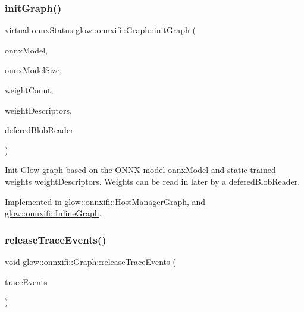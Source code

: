 \subsubsection{\texorpdfstring{init\+Graph()}{initGraph()}}
{\footnotesize\ttfamily virtual onnx\+Status glow\+::onnxifi\+::\+Graph\+::init\+Graph (\begin{DoxyParamCaption}\item[{const void $\ast$}]{onnx\+Model,  }\item[{size\+\_\+t}]{onnx\+Model\+Size,  }\item[{uint32\+\_\+t}]{weight\+Count,  }\item[{const onnx\+Tensor\+Descriptor\+V1 $\ast$}]{weight\+Descriptors,  }\item[{void $\ast$}]{defered\+Blob\+Reader }\end{DoxyParamCaption})\hspace{0.3cm}{\ttfamily [pure virtual]}}

Init Glow graph based on the O\+N\+NX model {\ttfamily onnx\+Model} and static trained weights {\ttfamily weight\+Descriptors}. Weights can be read in later by a {\ttfamily defered\+Blob\+Reader}. 

Implemented in \hyperlink{classglow_1_1onnxifi_1_1_host_manager_graph_a58234ef078e7db198825b214881fe7ef}{glow\+::onnxifi\+::\+Host\+Manager\+Graph}, and \hyperlink{classglow_1_1onnxifi_1_1_inline_graph_a989222c5a599a06aef3f7fc1c394f5eb}{glow\+::onnxifi\+::\+Inline\+Graph}.

\mbox{\label{classglow_1_1onnxifi_1_1_graph_a8fcbaaff1388becad2a7e3a1ee1a3439}} 
\subsubsection{\texorpdfstring{release\+Trace\+Events()}{releaseTraceEvents()}}
{\footnotesize\ttfamily void glow\+::onnxifi\+::\+Graph\+::release\+Trace\+Events (\begin{DoxyParamCaption}\item[{onnx\+Trace\+Event\+List $\ast$}]{trace\+Events }\end{DoxyParamCaption})\hspace{0.3cm}{\ttfamily [static]}}

